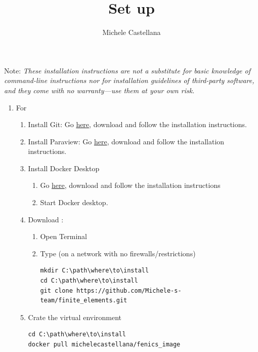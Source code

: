 \documentclass{article}
\title{Set up \libnamefortitle{}}
\author{Michele Castellana}
\date{}
\begin{document}
\maketitle

Note: \textit{These installation instructions are not a substitute for basic knowledge of command-line instructions nor for installation guidelines of third-party software, and they come with no warranty---use them at your own risk.}

\begin{enumerate}
      \item For \windows
            \begin{enumerate}
                  \item Install Git: Go \href{https://git-scm.com/install/windows}{here}, download and follow the installation instructions.
                  \item Install Paraview:                  Go  \href{https://www.paraview.org/download/}{here},  download and follow the installation instructions.
                  \item Install Docker Desktop
                        \begin{enumerate}
                              \item                   Go   \href{https://www.docker.com/products/docker-desktop/}{here}, download  and follow the installation instructions
                              \item Start Docker desktop.
                        \end{enumerate}
                  \item Download \libname{}:
                        \begin{enumerate}
                              \item Open Terminal
                              \item Type (on a network with no firewalls/restrictions)
                                    \begin{verbatim}
mkdir C:\path\where\to\install
cd C:\path\where\to\install
git clone https://github.com/Michele-s-team/finite_elements.git
                  \end{verbatim}
                        \end{enumerate}
                  \item Crate the virtual environment
                        \begin{verbatim}
cd C:\path\where\to\install
docker pull michelecastellana/fenics_image

\end{verbatim}
\end{enumerate}
\end{enumerate}
\end{document}
